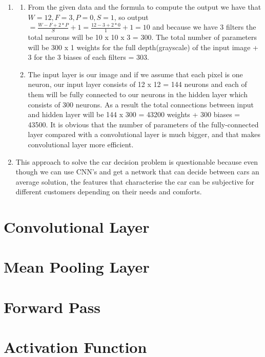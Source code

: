\documentclass{article}
\begin{document}
\begin{enumerate}
\item 
\begin{enumerate}
\item From the given data and the formula to compute the output we have that \(W=12, F=3, P=0, S=1\), so output \(= \frac{W - F + 2 * P}{S}+1 = \frac{12 - 3 + 2 * 0}{1}+1=  10\) and because we have 3 filters the total neurons will be 10 x 10 x 3 = 300. The total number of parameters will be 300 x 1 weights for the full depth(grayscale) of the input image + 3 for the 3 biases of each filters = 303.\\
\item
 The input layer is our image and if we assume that each pixel is one neuron, our input layer consists of 12 x 12 = 144 neurons and each of them will be fully connected to our neurons in the hidden layer which consists of 300 neurons. As a result the total connections between input and hidden layer will be 144 x 300 = 43200 weights + 300 biases = 43500. It is obvious that the number of parameters of the fully-connected layer compared with a convolutional layer is much bigger, and that makes convolutional layer more efficient. \\
\end{enumerate}
\item This approach to solve the car decision problem is questionable because even though we can use CNN's and get a network that can decide between cars an average solution, the features that characterise the car can be subjective for different customers depending on their needs and comforts.
\end{enumerate}
\setcounter{section}{+3}
\section{Convolutional Layer}

\section{Mean Pooling Layer}

\section{Forward Pass}

\section{Activation Function}

\end{document}
